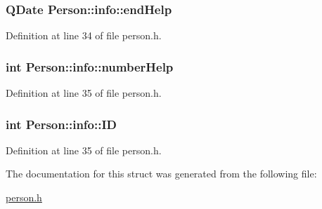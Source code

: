 \hypertarget{struct_person_1_1info_a1b774280eaa544c6cd8664f1d4797b6e}{
\subsubsection[{end\+Help}]{\setlength{\rightskip}{0pt plus 5cm}Q\+Date Person\+::info\+::end\+Help}}\label{struct_person_1_1info_a1b774280eaa544c6cd8664f1d4797b6e}


Definition at line 34 of file person.\+h.

\hypertarget{struct_person_1_1info_a6e17da0b05d6604b18d759363eecfc9f}{
\subsubsection[{number\+Help}]{\setlength{\rightskip}{0pt plus 5cm}int Person\+::info\+::number\+Help}}\label{struct_person_1_1info_a6e17da0b05d6604b18d759363eecfc9f}


Definition at line 35 of file person.\+h.

\hypertarget{struct_person_1_1info_a50a0afa03e7717b606892e8bfa9100da}{
\subsubsection[{I\+D}]{\setlength{\rightskip}{0pt plus 5cm}int Person\+::info\+::\+I\+D}}\label{struct_person_1_1info_a50a0afa03e7717b606892e8bfa9100da}


Definition at line 35 of file person.\+h.



The documentation for this struct was generated from the following file\+:\begin{DoxyCompactItemize}
\item 
\hyperlink{person_8h}{person.\+h}\end{DoxyCompactItemize}
